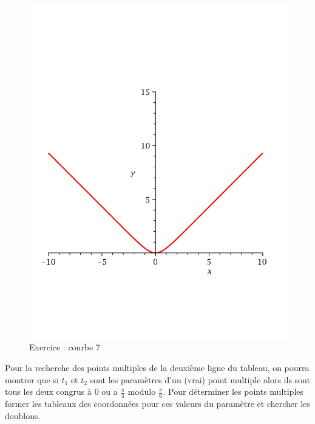 \begin{figure}[ht]
   \centering
   \includegraphics[scale=0.25]{Ecr01_7.pdf}
   \caption{Exercice  : courbe 7}
\end{figure}
Pour la recherche des points multiples de la deuxième ligne du tableau, on pourra montrer que si $t_1$ et $t_2$ sont les paramètres d'un (vrai) point multiple alors ils sont tous les deux congrus à $0$ ou a $\frac{\pi}{4}$ modulo $\frac{\pi}{6}$. Pour déterminer les points multiples former les tableaux des coordonnées pour ces valeurs du paramètre et chercher les doublons.  
